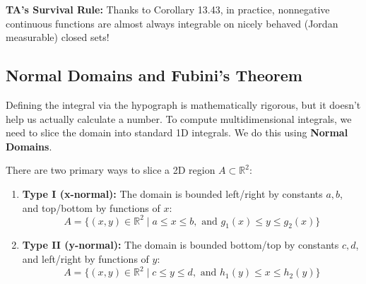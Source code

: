 \setcounter{section}{\value{savedSecMulti}}
\setcounter{theorem}{\value{savedThmMulti}}

\noindent
\textbf{TA's Survival Rule:} Thanks to Corollary 13.43, in practice, nonnegative continuous functions are almost always integrable on nicely behaved (Jordan measurable) closed sets!


\subsection{Normal Domains and Fubini's Theorem}

Defining the integral via the hypograph is mathematically rigorous, but it doesn't help us actually calculate a number. To compute multidimensional integrals, we need to slice the domain into standard 1D integrals. We do this using \textbf{Normal Domains}.

\begin{definition*}
There are two primary ways to slice a 2D region $A \subset \mathbb{R}^2$:
\begin{enumerate}
    \item \textbf{Type I (x-normal):} The domain is bounded left/right by constants $a, b$, and top/bottom by functions of $x$:
    \[
    A = \{ (x, y) \in \mathbb{R}^2 \mid a \le x \le b, \text{ and } g_1(x) \le y \le g_2(x) \}
    \]
    \item \textbf{Type II (y-normal):} The domain is bounded bottom/top by constants $c, d$, and left/right by functions of $y$:
    \[
    A = \{ (x, y) \in \mathbb{R}^2 \mid c \le y \le d, \text{ and } h_1(y) \le x \le h_2(y) \}
    \]
\end{enumerate}
\end{definition*}


